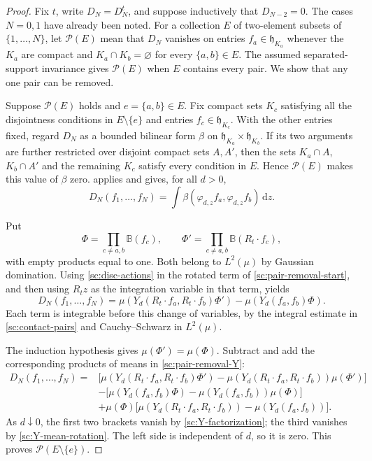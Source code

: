 \documentclass[11pt,letterpaper,reqno]{amsart}
\theoremstyle{definition}
\theoremstyle{remark}
\begin{document}
\begin{proof}
Fix $t$, write $D_N=D_N^t$, and suppose inductively that $D_{N-2}=0$.
The cases $N=0,1$ have already been noted. For a collection $E$ of
two-element subsets of $\{1,\ldots,N\}$, let $\mathcal P(E)$ mean that
$D_N$ vanishes on entries $f_a\in\mathfrak h_{K_a}$ whenever the $K_a$
are compact and $K_a\cap K_b=\varnothing$ for every $\{a,b\}\in E$.
The assumed separated-support invariance gives $\mathcal P(E)$ when
$E$ contains every pair. We show that any one pair can be removed.

Suppose $\mathcal P(E)$ holds and $e=\{a,b\}\in E$.
Fix compact sets $K_c$ satisfying all the disjointness conditions in
$E\setminus\{e\}$ and entries $f_c\in\mathfrak h_{K_c}$.
With the other entries fixed, regard $D_N$ as a bounded bilinear form
$\beta$ on $\mathfrak h_{K_a}\times\mathfrak h_{K_b}$.
If its two arguments are further restricted over disjoint compact sets
$A,A'$, then the sets $K_a\cap A$, $K_b\cap A'$ and the remaining $K_c$
satisfy every condition in $E$. Hence $\mathcal P(E)$ makes this value of
$\beta$ zero.  applies and gives, for all $d>0$,
\begin{equation}\label{sc:pair-removal-start}
D_N(f_1,\ldots,f_N)
 =\int\beta(\varphi_{d,z}f_a,\varphi_{d,z}f_b)\,\mathrm dz.
\end{equation}

Put
\[
\Phi=\prod_{c\ne a,b}\mathbb B(f_c),\qquad
\Phi'=\prod_{c\ne a,b}\mathbb B(R_t\cdot f_c),
\]
with empty products equal to one. Both belong to $L^2(\mu)$ by Gaussian
domination. Using \eqref{sc:disc-actions} in the rotated term of
\eqref{sc:pair-removal-start}, and then using $R_tz$ as the integration
variable in that term, yields
\begin{equation}\label{sc:pair-removal-Y}
D_N(f_1,\ldots,f_N)
 =\mu(Y_d(R_t\cdot f_a,R_t\cdot f_b)\Phi')
  -\mu(Y_d(f_a,f_b)\Phi).
\end{equation}
Each term is integrable before this change of variables, by the integral
estimate in \cref{sc:contact-pairs} and Cauchy--Schwarz in $L^2(\mu)$.

The induction hypothesis gives $\mu(\Phi')=\mu(\Phi)$. Subtract and add
the corresponding products of means in \eqref{sc:pair-removal-Y}:
\[
\begin{split}
D_N(f_1,\ldots,f_N)={}&
 \bigl[\mu(Y_d(R_t\cdot f_a,R_t\cdot f_b)\Phi')
  -\mu(Y_d(R_t\cdot f_a,R_t\cdot f_b))\mu(\Phi')\bigr]\\
&-\bigl[\mu(Y_d(f_a,f_b)\Phi)
  -\mu(Y_d(f_a,f_b))\mu(\Phi)\bigr]\\
&+\mu(\Phi)\bigl[\mu(Y_d(R_t\cdot f_a,R_t\cdot f_b))
  -\mu(Y_d(f_a,f_b))\bigr].
\end{split}
\]
As $d\downarrow0$, the first two brackets vanish by
\eqref{sc:Y-factorization}; the third vanishes by
\eqref{sc:Y-mean-rotation}. The left side is independent of $d$, so it is
zero. This proves $\mathcal P(E\setminus\{e\})$.


\end{proof}
\end{document}
